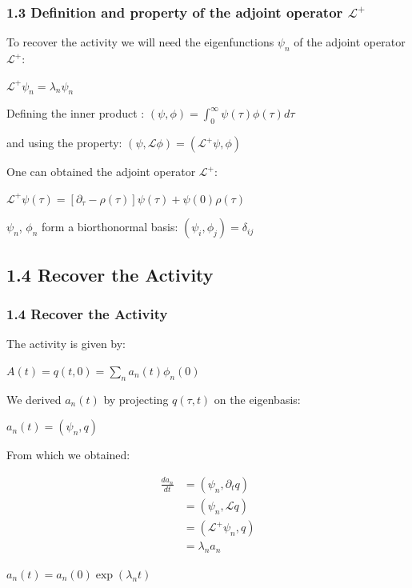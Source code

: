 \documentclass{beamer}
\begin{document}
\begin{frame}
\frametitle{1.3 Definition and property of the adjoint operator $\mathcal{L}^+$}

To recover the activity we will need the eigenfunctions $\psi_n$ of the adjoint operator $\mathcal{L}^+$:

\hspace{3.8cm}
$\mathcal{L}^+\psi_n=\lambda_n\psi_n$

\pause
\vspace{0.5cm}
Defining the inner product : $(\psi,\phi)=\int_{0}^{\infty}\psi(\tau)\phi(\tau)d\tau$

\vspace{0.5cm} and using the property: $(\psi,\mathcal{L}\phi)  = (\mathcal{L}^+\psi,\phi)$

\pause
\vspace{0.5cm} 
One can obtained the adjoint operator $\mathcal{L}^+$:


\vspace{0.2cm} 
\hspace{2cm}$
\mathcal{L}^+\psi(\tau)=[\partial_{\tau}-\rho(\tau)]\psi(\tau)+\psi(0)\rho(\tau)
$

\pause
\vspace{0.5cm} 
$\psi_n$, $\phi_n$ form a biorthonormal basis:
\vspace{0.3cm}
\hspace{3.8cm}
$
(\psi_i,\phi_j)=\delta_{ij}
$
\end{frame}


\subsection{1.4 Recover the Activity}
\begin{frame}
\frametitle{1.4 Recover the Activity}
The activity is given by:

\vspace{0.2cm}
\hspace{3cm} $A(t)=q(t,0)=\sum_n a_n(t)\phi_n(0) $

\pause
\vspace{0.5cm}
We derived $a_n(t)$ by projecting $q(\tau,t)$ on the eigenbasis:

\vspace{0.2cm}
\hspace{3cm}$ a_n(t)=(\psi_n,q)$

\pause
\vspace{0.5cm}
From which we obtained:

\begin{align*}
\frac{d a_n}{dt}&=(\psi_n,\partial_tq)  \\
&=(\psi_n,\mathcal{L}q)  \\
&=(\mathcal{L}^+\psi_n,q) \\
&=\lambda_na_n
\end{align*}

\vspace{0.2cm}
\hspace{3cm}$a_n(t) = a_n(0)\exp(\lambda_nt)$

\end{frame}
\end{document}
